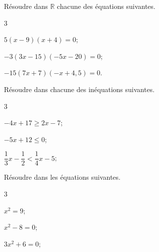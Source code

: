 \documentclass[11pt,a4paper]{article}  %
\begin{document}

Résoudre dans $\mathbb{R}$ chacune des équations suivantes.
\begin{multicols}{3}
	\begin{enumMet}
		\item $5(x-9)(x+4)=0$;
		\item $-3(3x-15)(-5x-20)=0$;
		\item {} $-15(7 x+7)(-x+4,5)=0$.
	\end{enumMet}
\end{multicols}


Résoudre dans \R chacune des inéquations suivantes.
\begin{multicols}{3}
	\begin{enumMet}
		\item $-4 x +17 \geqslant 2x-7$;
		\item $-5 x+12 \leqslant 0$;
		\item $\dfrac{1}{3} x-\dfrac{1}{2} < \dfrac{1}{4}x-5$;
	\end{enumMet}
\end{multicols}


Résoudre dans \R les équations suivantes.
\begin{multicols}{3}
	\begin{enumMet}
		\item $x^{2}=9$;
		\item {} $x^{2}-8=0$;
		\item $3 x^{2}+6=0$;
	\end{enumMet}
\end{multicols}
\end{document}
